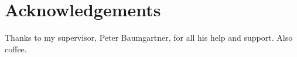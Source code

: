 
\chapter*{Acknowledgements}
\label{cha:ack}

Thanks to my supervisor, Peter Baumgartner, for all his help and support.
Also coffee.


